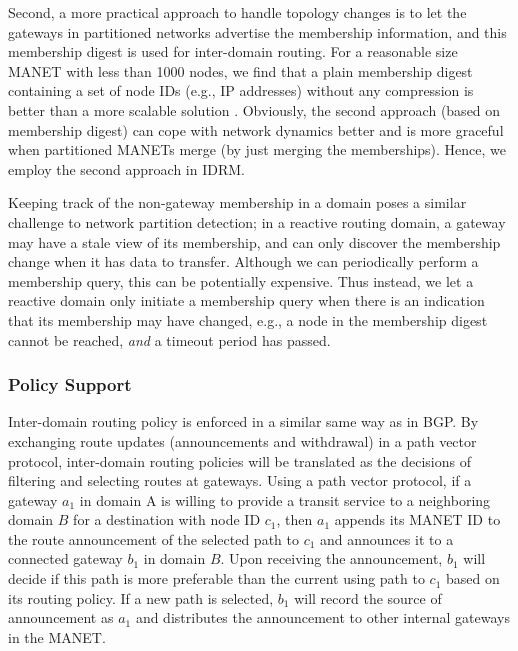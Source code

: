 Second, a more practical approach to handle topology changes is to let the gateways in partitioned networks advertise the membership information, and this membership digest is used for inter-domain routing. For a reasonable size MANET with less than 1000 nodes, we find that a plain membership digest containing a set of node IDs (e.g., IP addresses) without any compression is better than a more scalable solution \cite{idrm_tech}.
Obviously, the second approach (based on membership digest) can cope with network dynamics better and is more graceful when partitioned MANETs merge (by just merging the memberships). Hence, we employ the second approach in IDRM.

Keeping track of the non-gateway membership in a domain poses a similar challenge to network partition detection; in a reactive routing domain, a gateway may have a stale view of its membership, and can only discover the membership change when it has data to transfer. Although we can periodically perform a membership query, this can be potentially expensive. Thus instead, we let a reactive domain only initiate a membership query when there is an indication that its membership may have changed, e.g., a node in the membership digest cannot be reached, {\em and} a timeout period has passed.

\subsubsection{Policy Support} \label{sec::policy}

Inter-domain routing policy is enforced in a similar same way as in BGP. By exchanging route updates (announcements and withdrawal) in a path vector protocol, inter-domain routing policies will be translated as the decisions of filtering and selecting routes at gateways. Using a path vector protocol, if a gateway $a_1$ in domain A is willing to provide a transit service to a neighboring domain $B$ for a destination with node ID $c_1$, then $a_1$ appends its MANET ID to the route announcement of the selected path to $c_1$ and announces it to a connected gateway $b_1$ in domain $B$. Upon receiving the announcement, $b_1$ will decide if this path is more preferable than the current using path to $c_1$ based on its routing policy. If a new path is selected, $b_1$ will record the source of announcement as $a_1$ and distributes the announcement to other internal gateways in the MANET.

